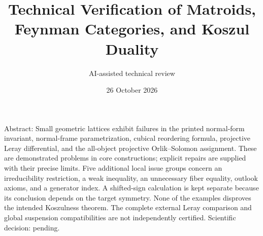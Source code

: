 \documentclass[10pt]{article}
\title{Technical Verification of
Matroids, Feynman Categories,
and Koszul Duality}
\author{AI-assisted technical review}
\date{26 October 2026}
\begin{document}
\maketitle
Abstract: Small geometric lattices exhibit failures in the printed normal-form invariant, normal-frame parametrization, cubical reordering formula, projective Leray differential, and the all-object projective Orlik–Solomon assignment. These are demonstrated problems in core constructions; explicit repairs are supplied with their precise limits. Five additional local issue groups concern an irreducibility restriction, a weak inequality, an unnecessary fiber equality, outlook axioms, and a generator index. A shifted-sign calculation is kept separate because its conclusion depends on the target symmetry. None of the examples disproves the intended Koszulness theorem. The complete external Leray comparison and global suspension compatibilities are not independently certified. Scientific decision: pending.\par
\end{document}

